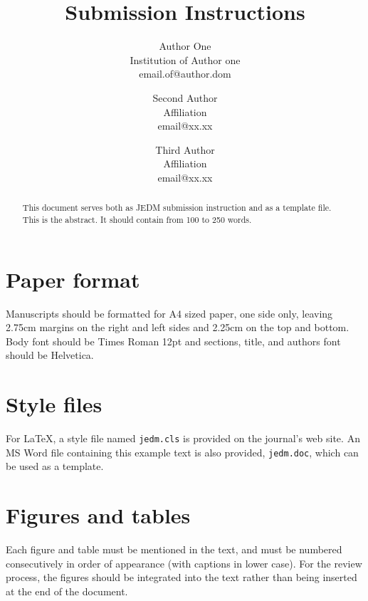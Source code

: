 \documentclass[a4,notitlepage,12pt]{jedm}
\begin{document}
\title{Submission Instructions}
\date{}

\author{{\large Author One}\\Institution of Author one\\email.of@author.dom \and {\large Second Author}\\Affiliation\\email@xx.xx  \and {\large Third Author}\\Affiliation\\email@xx.xx }

\maketitle

\begin{abstract}
This document serves both as JEDM submission instruction and as a template file.  This is the abstract. It should contain from 100 to 250 words.
\end{abstract}


\section{Paper format}

Manuscripts should be formatted for A4 sized paper, one side only, leaving 2.75cm margins on the right and left sides and 2.25cm on the top and bottom. Body font should be Times Roman 12pt and sections, title, and authors font should be Helvetica.

\section{Style files}

For LaTeX, a style file named \texttt{jedm.cls} is provided on the journal's web site.  An MS Word file containing this example text is also provided, \texttt{jedm.doc}, which can be used as a template.

\section{Figures and tables}

Each figure and table must be mentioned in the text, and must be numbered consecutively in order of appearance (with captions in lower case). For the review process, the figures should be integrated into the text rather than being inserted at the end of the document.
\end{document}
